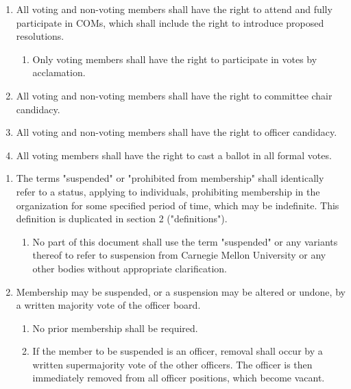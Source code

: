 \documentclass[11pt]{article}
\newcounter{h1}
\newcounter{h2}[h1]
\newcounter{h3}[h2]
\begin{document}
\begin{enumerate}
  \item All voting and non-voting members shall have the right to attend and fully participate in COMs, which shall include the right to introduce proposed resolutions.
  \begin{enumerate}
    \item Only voting members shall have the right to participate in votes by acclamation.
  \end{enumerate}
  \item All voting and non-voting members shall have the right to committee chair candidacy.
  \item All voting and non-voting members shall have the right to officer candidacy.
  \item All voting members shall have the right to cast a ballot in all formal votes.
\end{enumerate}


\begin{enumerate}
  \item The terms "suspended" or "prohibited from membership" shall identically refer to a status, applying to individuals, prohibiting membership in the organization for some specified period of time, which may be indefinite. This definition is duplicated in section 2 ("definitions").
  \begin{enumerate}
    \item No part of this document shall use the term "suspended" or any variants thereof to refer to suspension from Carnegie Mellon University or any other bodies without appropriate clarification.
  \end{enumerate}
  \item Membership may be suspended, or a suspension may be altered or undone, by a written majority vote of the officer board.
  \begin{enumerate}
    \item No prior membership shall be required.
    \item If the member to be suspended is an officer, removal shall occur by a written supermajority vote of the other officers. The officer is then immediately removed from all officer positions, which become vacant.
  \end{enumerate}
\end{enumerate}

\end{document}
